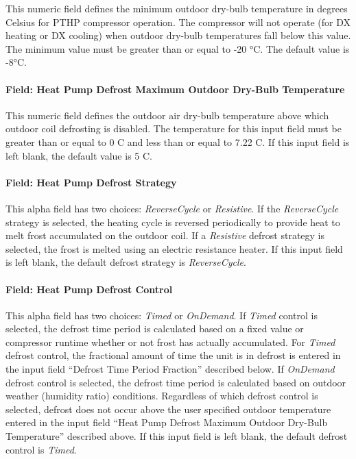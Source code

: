This numeric field defines the minimum outdoor dry-bulb temperature in degrees Celsius for PTHP compressor operation. The compressor will not operate (for DX heating or DX cooling) when outdoor dry-bulb temperatures fall below this value. The minimum value must be greater than or equal to -20 °C. The default value is -8°C.

\paragraph{Field: Heat Pump Defrost Maximum Outdoor Dry-Bulb Temperature}\label{field-heat-pump-defrost-maximum-outdoor-dry-bulb-temperature}

This numeric field defines the outdoor air dry-bulb temperature above which outdoor coil defrosting is disabled. The temperature for this input field must be greater than or equal to 0 C and less than or equal to 7.22 C. If this input field is left blank, the default value is 5 C.

\paragraph{Field: Heat Pump Defrost Strategy}\label{field-heat-pump-defrost-strategy}

This alpha field has two choices: \emph{ReverseCycle} or \emph{Resistive}. If the \emph{ReverseCycle} strategy is selected, the heating cycle is reversed periodically to provide heat to melt frost accumulated on the outdoor coil. If a \emph{Resistive} defrost strategy is selected, the frost is melted using an electric resistance heater. If this input field is left blank, the default defrost strategy is \emph{ReverseCycle}.

\paragraph{Field: Heat Pump Defrost Control}\label{field-heat-pump-defrost-control}

This alpha field has two choices: \emph{Timed} or \emph{OnDemand}. If \emph{Timed} control is selected, the defrost time period is calculated based on a fixed value or compressor runtime whether or not frost has actually accumulated. For \emph{Timed} defrost control, the fractional amount of time the unit is in defrost is entered in the input field ``Defrost Time Period Fraction'' described below. If \emph{OnDemand} defrost control is selected, the defrost time period is calculated based on outdoor weather (humidity ratio) conditions. Regardless of which defrost control is selected, defrost does not occur above the user specified outdoor temperature entered in the input field ``Heat Pump Defrost Maximum Outdoor Dry-Bulb Temperature'' described above. If this input field is left blank, the default defrost control is \emph{Timed}.

